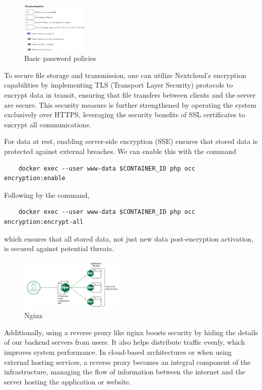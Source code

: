 \documentclass[12pt]{article}
\begin{document}
\begin{figure}
  \centering
  \includegraphics[width=0.28\textwidth]{Posnetek zaslona 2024-03-21 091850.png}
  \caption{Basic password policies}
  \label{fig:yourlabel}
\end{figure}


To secure file storage and transmission, one can utilize Nextcloud's encryption capabilities by implementing TLS (Transport Layer Security) protocols to encrypt data in transit, ensuring that file transfers between clients and the server are secure. This security measure is further strengthened by operating the system exclusively over HTTPS, leveraging the security benefits of SSL certificates to encrypt all communications. 

For data at rest, enabling server-side encryption (SSE) ensures that stored data is protected against external breaches. We can enable this with the command
\begin{verbatim}
    docker exec --user www-data $CONTAINER_ID php occ encryption:enable
\end{verbatim}
Following by the command,
\begin{verbatim}
    docker exec --user www-data $CONTAINER_ID php occ encryption:encrypt-all
\end{verbatim}
which ensures that all stored data, not just new data post-encryption activation, is secured against potential threats.

\begin{figure}
  \centering
  \includegraphics[width=0.45\textwidth]{Nginx_sec.png}
  \caption{Nginx}
  \label{fig:yourlabel}
\end{figure}

Additionally, using a reverse proxy like nginx boosts security by hiding the details of our backend servers from users. It also helps distribute traffic evenly, which improves system performance. In cloud-based architectures or when using external hosting services, a reverse proxy becomes an integral component of the infrastructure, managing the flow of information between the internet and the server hosting the application or website.
\end{document}
